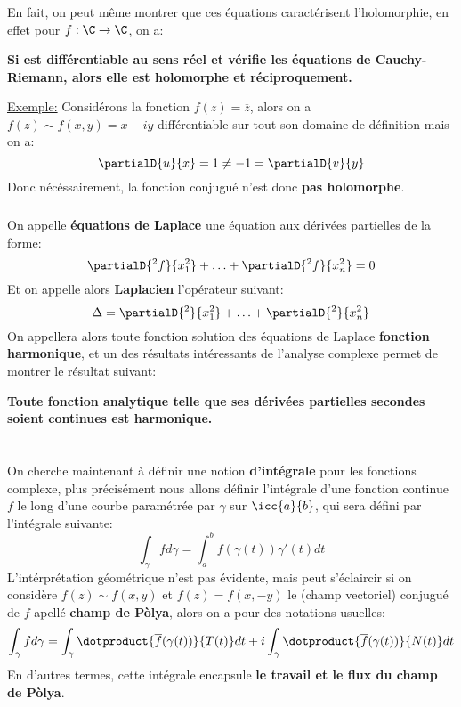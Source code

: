 \subsection*{}
En fait, on peut même montrer que ces équations caractérisent l'holomorphie, en effet pour \(f : \C \rightarrow \C\), on a:
\begin{center}
   \textbf{Si est différentiable \textbf{au sens réel} et vérifie les équations de Cauchy-Riemann, alors elle est holomorphe et réciproquement.}
\end{center}
\uline{Exemple:} Considérons la fonction \(f(z) = \overline{z}\), alors on a \(f(z) \sim f(x, y) = x - iy\) différentiable sur tout son domaine de définition mais on a:
\[
   \partialD{u}{x} = 1 \neq -1 = \partialD{v}{y} 
\]
Donc nécéssairement, la fonction conjugué n'est donc \textbf{pas holomorphe}.
\subsection*{}
On appelle \textbf{équations de Laplace} une équation aux dérivées partielles de la forme:
\[
   \partialD{{}^2f}{x_1^2} + \ldots + \partialD{{}^2f}{x_n^2} = 0
\]
Et on appelle alors \textbf{Laplacien} l'opérateur suivant:
\[
   \Delta = \partialD{{}^2}{x_1^2} + \ldots + \partialD{{}^2}{x_n^2}
\]
On appellera alors toute fonction solution des équations de Laplace \textbf{fonction harmonique}, et un des résultats intéressants de l'analyse complexe permet de montrer le résultat suivant:
\begin{center}
   \textbf{Toute fonction analytique telle que ses dérivées partielles secondes soient continues est harmonique.}
\end{center}


\chapter*{} %
On cherche maintenant à définir une notion \textbf{d'intégrale} pour les fonctions complexe, plus précisément nous allons définir l'intégrale d'une fonction continue \(f\) le long d'une courbe paramétrée par \(\gamma\) sur \(\icc{a}{b}\), qui sera défini par l'intégrale suivante:
\[
   \int_{\gamma} f d\gamma = \int_{a}^{b} f(\gamma(t))\gamma'(t) d t
\]
L'intérprétation géométrique n'est pas évidente, mais peut s'éclaircir si on considère \(f(z) \sim f(x, y)\) et \(\overline{f}(z) = f(x, -y)\) le (champ vectoriel) conjugué de \(f\) apellé \textbf{champ de Pòlya}, alors on a pour des notations usuelles:
\[
   \int_{\gamma} f d\gamma = \int_{\gamma} \dotproduct{\overline{f}(\gamma(t))}{T(t)} d t + i \int_{\gamma} \dotproduct{\overline{f}(\gamma(t))}{N(t)}  d t
\]
En d'autres termes, cette intégrale encapsule \textbf{le travail et le flux du champ de Pòlya}.

